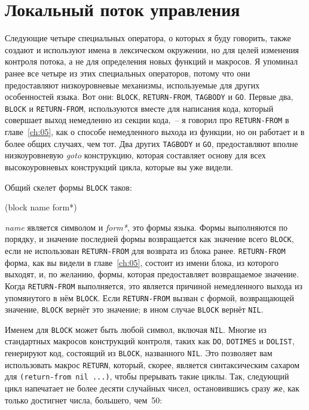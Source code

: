 \section{Локальный поток управления}

Следующие четыре специальных оператора, о которых я буду говорить, также создают и
используют имена в лексическом окружении, но для целей изменения контроля потока, а не для
определения новых функций и макросов. Я упоминал ранее все четыре из этих специальных
операторов, потому что они предоставляют низкоуровневые механизмы, используемые для других
особенностей языка. Вот они: \lstinline{BLOCK}, \lstinline{RETURN-FROM}, \lstinline{TAGBODY} и
\lstinline{GO}. Первые два, \lstinline{BLOCK} и \lstinline{RETURN-FROM}, используются вместе для
написания кода, который совершает выход немедленно из секции кода,~-- я говорил про
\lstinline{RETURN-FROM} в главе~\ref{ch:05}, как о способе немедленного выхода из функции, но
он работает и в более общих случаях, чем тот. Два других \lstinline{TAGBODY} и \lstinline{GO},
предоставляют вполне низкоуровневую \textit{goto} конструкцию, которая составляет основу для всех
высокоуровневых конструкций цикла, которые вы уже видели.

Общий скелет формы \lstinline{BLOCK} таков:

\begin{myverb}
(block name
  form*)
\end{myverb}

\noindent{}\textit{name} является символом и \textit{form*}, это формы языка. Формы выполняются по
порядку, и значение последней формы возвращается как значение всего \lstinline{BLOCK}, если не
использован \lstinline{RETURN-FROM} для возврата из блока ранее. \lstinline{RETURN-FROM} форма, как
вы видели в главе~\ref{ch:05}, состоит из имени блока, из которого выходят, и, по желанию, формы,
которая предоставляет возвращаемое значение.  Когда \lstinline{RETURN-FROM} выполняется, это
является причиной немедленного выхода из упомянутого в нём \lstinline{BLOCK}.  Если
\lstinline{RETURN-FROM} вызван с формой, возвращающей значение, \lstinline{BLOCK} вернёт это
значение; в ином случае \lstinline{BLOCK} вернёт \lstinline{NIL}.

Именем для \lstinline{BLOCK} может быть любой символ, включая \lstinline{NIL}. Многие из стандартных
макросов конструкций контроля, таких как \lstinline{DO}, \lstinline{DOTIMES} и \lstinline{DOLIST},
генерируют код, состоящий из \lstinline{BLOCK}, названного \lstinline{NIL}. Это позволяет вам
использовать макрос \lstinline{RETURN}, который, скорее, является синтаксическим сахаром для
\lstinline!(return-from nil ...)!, чтобы прерывать такие циклы. Так, следующий цикл
напечатает не более десяти случайных чисел, остановившись сразу же, как только достигнет
числа, большего, чем~50:

